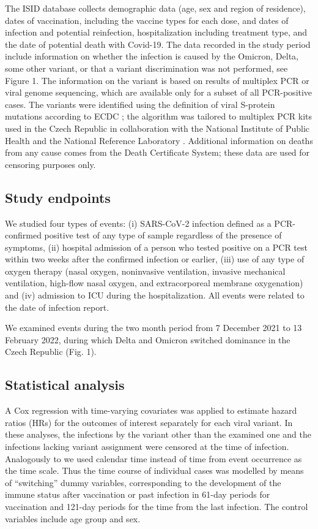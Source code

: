 \documentclass[a4paper,12pt]{article}
\def\figdiscrim{1}
\begin{document}
The ISID database collects demographic data (age, sex and region of residence), dates of vaccination, including the vaccine types for each dose, and dates of infection and potential reinfection, hospitalization including treatment type, and the date of potential death with Covid-19. The data recorded in the study period include information on whether the infection is caused by the Omicron, Delta, some other variant, or that a variant discrimination was not performed, see Figure \figdiscrim. The information on the variant is based on results of multiplex PCR or viral genome sequencing, which are available only for a subset of all PCR-positive cases. The variants were identified using the definition of viral S-protein mutations according to ECDC \citep{ECDC_var_concern}; the algorithm was tailored to multiplex PCR kits used in the Czech Republic in collaboration with the National Institute of Public Health and the National Reference Laboratory \citep{SZU_zprava}. Additional information on deaths from any cause comes from the Death Certificate System; these data are used for censoring purposes only.

\subsection*{Study endpoints}

We studied four types of events: (i) SARS-CoV-2 infection defined as a PCR-confirmed positive test of any type of sample regardless of the presence of symptoms, (ii) hospital admission of a person who tested positive on a PCR test within two weeks after the confirmed infection or earlier, (iii) use of any type of oxygen therapy (nasal oxygen, noninvasive ventilation, invasive mechanical ventilation, high-flow nasal oxygen, and extracorporeal membrane oxygenation) and (iv) admission to ICU during the hospitalization. All events were related to the date of infection report.

We examined events during the two month period from 7 December 2021 to 13 February 2022, during which Delta and Omicron switched dominance in the Czech Republic (Fig. \figdiscrim). 

\subsection*{Statistical analysis}
A Cox regression with time-varying covariates was applied to estimate hazard ratios (HRs) for the outcomes of interest separately for each viral variant. In these analyses, the infections by the variant other than the examined one and the infections lacking variant assignment were censored at the time of infection. Analogously to \citep{tartof2021effectiveness} we used calendar time instead of time from event occurrence as the time scale. Thus the time course of individual cases was modelled by means of ``switching'' dummy variables, corresponding to the development of the immune status after vaccination or past infection in 61-day periods for vaccination and 121-day periods for the time from the last infection. The control variables include age group and sex.
\end{document}
